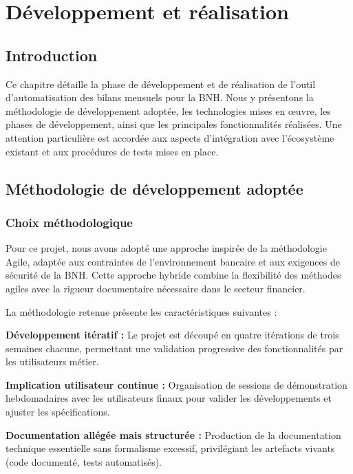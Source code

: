 \chapter{Développement et réalisation}
\clearpage
\label{chap:realisation}

\section{Introduction}

Ce chapitre détaille la phase de développement et de réalisation de l'outil d'automatisation des bilans mensuels pour la BNH. Nous y présentons la méthodologie de développement adoptée, les technologies mises en œuvre, les phases de développement, ainsi que les principales fonctionnalités réalisées. Une attention particulière est accordée aux aspects d'intégration avec l'écosystème existant et aux procédures de tests mises en place.

\section{Méthodologie de développement adoptée}

\subsection{Choix méthodologique}

Pour ce projet, nous avons adopté une approche inspirée de la méthodologie Agile, adaptée aux contraintes de l'environnement bancaire et aux exigences de sécurité de la BNH. Cette approche hybride combine la flexibilité des méthodes agiles avec la rigueur documentaire nécessaire dans le secteur financier.

\medskip

La méthodologie retenue présente les caractéristiques suivantes :

\textbf{Développement itératif :} Le projet est découpé en quatre itérations de trois semaines chacune, permettant une validation progressive des fonctionnalités par les utilisateurs métier.

\textbf{Implication utilisateur continue :} Organisation de sessions de démonstration hebdomadaires avec les utilisateurs finaux pour valider les développements et ajuster les spécifications.

\textbf{Documentation allégée mais structurée :} Production de la documentation technique essentielle sans formalisme excessif, privilégiant les artefacts vivants (code documenté, tests automatisés).

